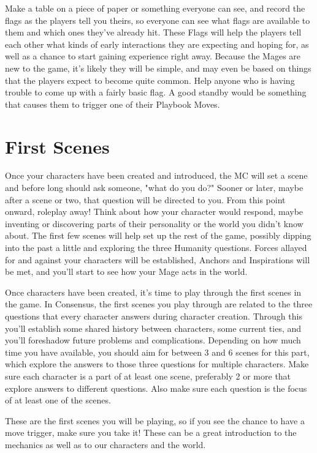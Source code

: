 \documentclass[
  oneside,
  statementpaper,
  9pt]{memoir}
\begin{document}
\begin{MC}

Make a table on a piece of paper or something everyone can see, and record the flags as the players tell you theirs, so everyone can see what flags are available to them and which ones they've already hit. These Flags will help the players tell each other what kinds of early interactions they are expecting and hoping for, as well as a chance to start gaining experience right away. Because the Mages are new to the game, it’s likely they will be simple, and may even be based on things that the players expect to become quite common. Help anyone who is having trouble to come up with a fairly basic flag. A good standby would be something that causes them to trigger one of their Playbook Moves.

\end{MC}

\hypertarget{first-scenes}{%
\section{First Scenes}\label{first-scenes}}

\begin{Player}

Once your characters have been created and introduced, the MC will set a scene and before long should ask someone, "what do you do?" Sooner or later, maybe after a scene or two, that question will be directed to you. From this point onward, roleplay away! Think about how your character would respond, maybe inventing or discovering parts of their personality or the world you didn't know about. The first few scenes will help set up the rest of the game, possibly dipping into the past a little and exploring the three Humanity questions. Forces allayed for and against your characters will be established, Anchors and Inspirations will be met, and you'll start to see how your Mage acts in the world.

\end{Player}

\begin{MC}

Once characters have been created, it’s time to play through the first scenes in the game. In Consensus, the first scenes you play through are related to the three questions that every character answers during character creation. Through this you’ll establish some shared history between characters, some current ties, and you’ll foreshadow future problems and complications. Depending on how much time you have available, you should aim for between 3 and 6 scenes for this part, which explore the answers to those three questions for multiple characters. Make sure each character is a part of at least one scene, preferably 2 or more that explore answers to different questions. Also make sure each question is the focus of at least one of the scenes.

These are the first scenes you will be playing, so if you see the chance to have a move trigger, make sure you take it! These can be a great introduction to the mechanics as well as to our characters and the world.

\end{MC}
\end{document}
